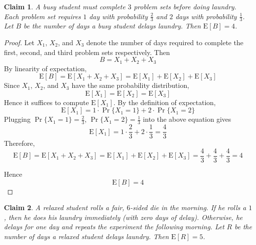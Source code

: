 \documentclass{article}
\newtheorem{claim}{Claim}
\begin{document}
\begin{claim}
    A busy student must complete $3$ problem sets before doing laundry. Each problem set 
    requires $1$ day with probability $\frac{2}{3}$ and $2$ days with probability 
    $\frac{1}{3}$. Let $B$ be the number of days a busy student delays laundry. Then 
    $\mathrm{E}[B] = 4$.
\end{claim}

\begin{proof}
    Let $X_1$, $X_2$, and $X_3$ denote the number of days required to complete the first, 
    second, and third problem sets respectively. Then 
    \[
    B = X_1 + X_2 + X_3
    \]
    By linearity of expectation,
    \[
    \mathrm{E}[B] = \mathrm{E}[X_1 + X_2 + X_3] 
    = \mathrm{E}[X_1] + \mathrm{E}[X_2] + \mathrm{E}[X_3]
    \]
    Since $X_1$, $X_2$, and $X_3$ have the same probability distribution, 
    \[
    \mathrm{E}[X_1] = \mathrm{E}[X_2] = \mathrm{E}[X_3]
    \]
    Hence it suffices to compute 
    $\mathrm{E}[X_1]$. By the definition of expectation,
    \[
    \mathrm{E}[X_1] = 1 \cdot \Pr\{X_1 = 1\} + 2 \cdot \Pr\{X_1 = 2\}
    \]
    Plugging $\Pr\{X_1 = 1\} = \frac{2}{3}$, $\Pr\{X_1 = 2\} = \frac{1}{3}$ into the above 
    equation gives
    \[
    \mathrm{E}[X_1] = 1 \cdot \frac{2}{3} + 2 \cdot \frac{1}{3} = \frac{4}{3}
    \]
    Therefore,
    \[
    \mathrm{E}[B] = \mathrm{E}[X_1 + X_2 + X_3] 
    = \mathrm{E}[X_1] + \mathrm{E}[X_2] + \mathrm{E}[X_3] 
    = \frac{4}{3} + \frac{4}{3} + \frac{4}{3} = 4
    \]

    \medskip

    Hence 
    \[
    \mathrm{E}[B] = 4
    \]
\end{proof}

\begin{claim}
    A relaxed student rolls a fair, $6$-sided die in the morning. If he rolls a $1$, then he 
    does his laundry immediately (with zero days of delay). Otherwise, he delays for one 
    day and repeats the experiment the following morning. Let $R$ be the number of days a 
    relaxed student delays laundry. Then $\mathrm{E}[R] = 5$.
\end{claim}
\end{document}
